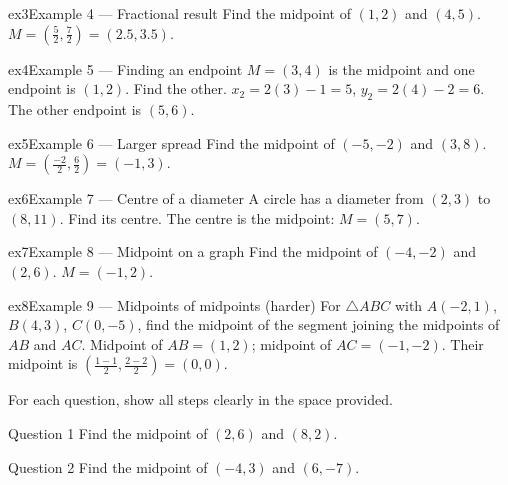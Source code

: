 \documentclass[11pt]{article}
\begin{document}
\begin{example}{ex3}{Example 4 --- Fractional result}
Find the midpoint of $(1,2)$ and $(4,5)$.
\soln $M=\left(\tfrac{5}{2},\tfrac{7}{2}\right)=(2.5,3.5).$
\end{example}

\begin{example}{ex4}{Example 5 --- Finding an endpoint}
$M=(3,4)$ is the midpoint and one endpoint is $(1,2)$. Find the other.
\soln $x_2=2(3)-1=5$, $y_2=2(4)-2=6$. The other endpoint is $(5,6)$.
\end{example}

\begin{example}{ex5}{Example 6 --- Larger spread}
Find the midpoint of $(-5,-2)$ and $(3,8)$.
\soln $M=\left(\tfrac{-2}{2},\tfrac{6}{2}\right)=(-1,3).$
\end{example}

\begin{example}{ex6}{Example 7 --- Centre of a diameter}
A circle has a diameter from $(2,3)$ to $(8,11)$. Find its centre.
\soln The centre is the midpoint: $M=(5,7).$
\end{example}

\begin{example}{ex7}{Example 8 --- Midpoint on a graph}
Find the midpoint of $(-4,-2)$ and $(2,6)$.
\soln $M=(-1,2).$
\end{example}

\begin{example}{ex8}{Example 9 --- Midpoints of midpoints (harder)}
For $\triangle ABC$ with $A(-2,1)$, $B(4,3)$, $C(0,-5)$, find the midpoint of the segment joining the midpoints of $AB$ and $AC$.
\soln Midpoint of $AB=(1,2)$; midpoint of $AC=(-1,-2)$. Their midpoint is $\left(\tfrac{1-1}{2},\tfrac{2-2}{2}\right)=(0,0).$
\end{example}

\clearpage
{}
For each question, show all steps clearly in the space provided.

\begin{qbox}{Question 1}
Find the midpoint of $(2,6)$ and $(8,2)$.\workspace{2.0cm}
\end{qbox}

\begin{qbox}{Question 2}
Find the midpoint of $(-4,3)$ and $(6,-7)$.\workspace{2.0cm}
\end{qbox}
\end{document}
